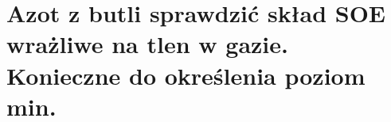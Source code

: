\section{Azot z butli sprawdzić skład SOE wrażliwe na tlen w gazie. Konieczne
do określenia poziom min.}